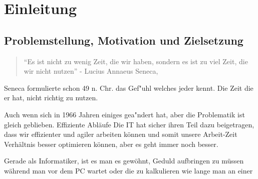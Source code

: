 \chapter{Einleitung}
\section{Problemstellung, Motivation und Zielsetzung}


\begin{quote}
	``Es ist nicht zu wenig Zeit, die wir haben, sondern es ist zu viel Zeit, die wir nicht nutzen'' - Lucius Annaeus Seneca, \cite{Apelt200511}
\end{quote}
Seneca formulierte schon 49 n. Chr. das Gef"uhl welches jeder kennt. Die Zeit die er hat, nicht richtig zu nutzen.



Auch wenn sich in 1966 Jahren einiges gea"ndert hat, aber die Problematik ist gleich geblieben.
Effiziente Abläufe  
Die IT hat sicher ihren Teil dazu beigetragen, dass wir effizienter und agiler arbeiten können und somit unsere Arbeit-Zeit Verhältnis besser optimieren können,
aber es geht immer noch besser.

Gerade als Informatiker, ist es man es gewöhnt, Geduld aufbringen zu müssen während man vor dem PC wartet oder die zu kalkulieren wie lange man an einer 







